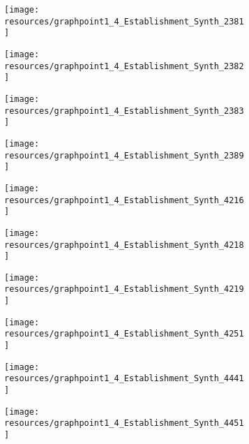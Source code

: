 \documentclass[12pt]{article}
\begin{document}
\begin{figure}[H]
	\centering
	\begin{subfigure}[b]{0.4\textwidth}
	    \texttt{[image: resources/graphpoint1\_4\_Establishment\_Synth\_2381]}
	\end{subfigure}
	\begin{subfigure}[b]{0.4\textwidth}
	    \texttt{[image: resources/graphpoint1\_4\_Establishment\_Synth\_2382]}
	\end{subfigure}
\end{figure}

\begin{figure}[H]
	\centering
	\begin{subfigure}[b]{0.4\textwidth}
	    \texttt{[image: resources/graphpoint1\_4\_Establishment\_Synth\_2383]}
	\end{subfigure}
	\begin{subfigure}[b]{0.4\textwidth}
	    \texttt{[image: resources/graphpoint1\_4\_Establishment\_Synth\_2389]}
	\end{subfigure}
\end{figure}

\begin{figure}[H]
	\centering
	\begin{subfigure}[b]{0.4\textwidth}
	    \texttt{[image: resources/graphpoint1\_4\_Establishment\_Synth\_4216]}
	\end{subfigure}
	\begin{subfigure}[b]{0.4\textwidth}
	    \texttt{[image: resources/graphpoint1\_4\_Establishment\_Synth\_4218]}
	\end{subfigure}
\end{figure}

\begin{figure}[H]
	\centering
	\begin{subfigure}[b]{0.4\textwidth}
	    \texttt{[image: resources/graphpoint1\_4\_Establishment\_Synth\_4219]}
	\end{subfigure}
	\begin{subfigure}[b]{0.4\textwidth}
	    \texttt{[image: resources/graphpoint1\_4\_Establishment\_Synth\_4251]}
	\end{subfigure}
\end{figure}

\begin{figure}[H]
	\centering
	\begin{subfigure}[b]{0.4\textwidth}
	    \texttt{[image: resources/graphpoint1\_4\_Establishment\_Synth\_4441]}
	\end{subfigure}
	\begin{subfigure}[b]{0.4\textwidth}
	    \texttt{[image: resources/graphpoint1\_4\_Establishment\_Synth\_4451]}
	\end{subfigure}
\end{figure}
\end{document}
